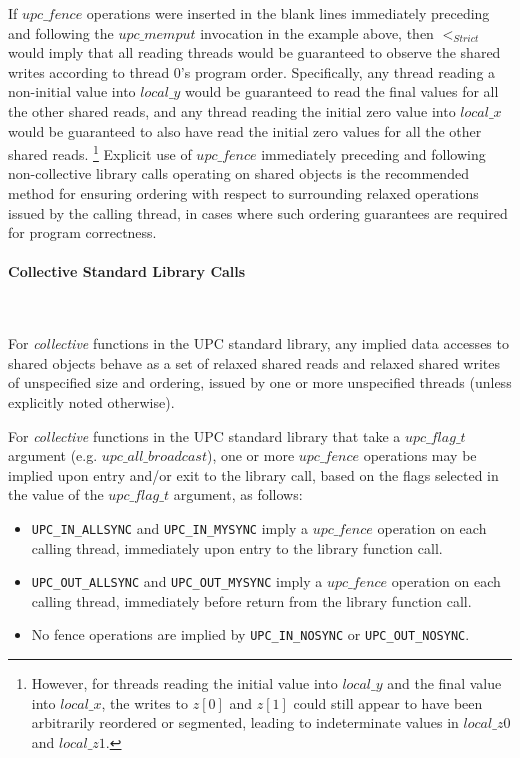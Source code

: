 \documentclass[12pt,titlepage]{article}
\newcounter{parnum}
\newcommand{\tab}{\textt{~~~~~~}}
\newcommand{\np}{
  \addtocounter{parnum}{1}
  \latex{\hspace{-2em}\makebox[2em][l]{\arabic{parnum}}}
  \html{{\bf {\arabic{parnum}}}\tab}}
\newcommand{\npf}{\setcounter{parnum}{0}\np}
\begin{document}
\np If $upc\_fence$ operations were inserted in the blank lines immediately
preceding and following the $upc\_memput$ invocation in the example above, then
$<_{Strict}$ would imply that all reading threads would be guaranteed to observe
the shared writes according to thread 0's program order.  Specifically, any
thread reading a non-initial value into $local\_y$ would be guaranteed to read
the final values for all the other shared reads, and any thread reading the
initial zero value into $local\_x$ would be guaranteed to also have read the
initial zero values for all the other shared reads.%
\footnote{However, for threads reading the initial value into $local\_y$ and
the final value into $local\_x$, the writes to $z[0]$ and $z[1]$ could still
appear to have been arbitrarily reordered or segmented, leading to
indeterminate values in $local\_z0$ and $local\_z1$.}
Explicit use of $upc\_fence$ immediately preceding and following non-collective
library calls operating on shared objects is the recommended method for
ensuring ordering with respect to surrounding relaxed operations issued by the
calling thread, in cases where such ordering guarantees are required
for program correctness.

\paragraph{Collective Standard Library Calls}\ \\

\npf For {\it collective} functions in the UPC standard library, any implied data
accesses to shared objects behave as a set of relaxed shared reads and relaxed
shared writes of unspecified size and ordering, issued by one or more
unspecified threads (unless explicitly noted otherwise).

\np For {\it collective} functions in the UPC standard library
that take a $upc\_flag\_t$
argument (e.g. $upc\_all\_broadcast$), one or more $upc\_fence$ operations
may be implied upon entry and/or exit to the library call, 
based on the flags selected in the value of the $upc\_flag\_t$ argument, as follows:

\begin{itemize}
\item
{\tt UPC\_IN\_ALLSYNC} and {\tt UPC\_IN\_MYSYNC} imply a $upc\_fence$ operation on 
each calling thread, immediately upon entry to the library function call.

\item
{\tt UPC\_OUT\_ALLSYNC} and {\tt UPC\_OUT\_MYSYNC} imply a $upc\_fence$ operation on 
each calling thread, immediately before return from the library function call.

\item 
No fence operations are implied by {\tt UPC\_IN\_NOSYNC} or {\tt UPC\_OUT\_NOSYNC}.
\end{itemize}
\end{document}
